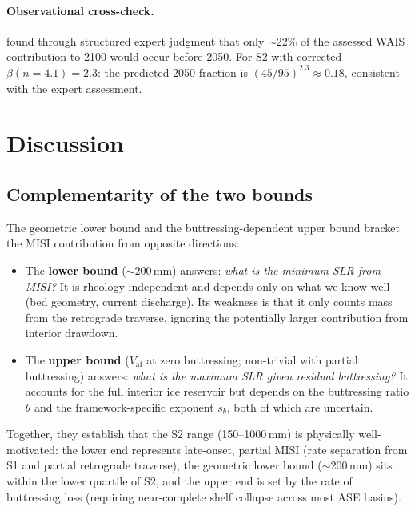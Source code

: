 \documentclass[11pt]{article}
\newcommand{\Vaf}{V_{\mathrm{af}}}
\begin{document}
\paragraph{Observational cross-check.} \citet{Bamber2019} found through structured expert judgment that only $\sim$22\% of the assessed WAIS contribution to 2100 would occur before 2050. For S2 with corrected $\beta(n{=}4.1) = 2.3$: the predicted 2050 fraction is $(45/95)^{2.3} \approx 0.18$, consistent with the expert assessment.


\section{Discussion}
\label{sec:discussion}

\subsection{Complementarity of the two bounds}

The geometric lower bound and the buttressing-dependent upper bound bracket the MISI contribution from opposite directions:

\begin{itemize}
	\item The \textbf{lower bound} ($\sim$200\,mm) answers: \emph{what is the minimum SLR from MISI?} It is rheology-independent and depends only on what we know well (bed geometry, current discharge). Its weakness is that it only counts mass from the retrograde traverse, ignoring the potentially larger contribution from interior drawdown.

	\item The \textbf{upper bound} ($\Vaf$ at zero buttressing; non-trivial with partial buttressing) answers: \emph{what is the maximum SLR given residual buttressing?} It accounts for the full interior ice reservoir but depends on the buttressing ratio $\theta$ and the framework-specific exponent $s_b$, both of which are uncertain.
\end{itemize}

Together, they establish that the S2 range (150--1000\,mm) is physically well-motivated: the lower end represents late-onset, partial MISI (rate separation from S1 and partial retrograde traverse), the geometric lower bound ($\sim$200\,mm) sits within the lower quartile of S2, and the upper end is set by the rate of buttressing loss (requiring near-complete shelf collapse across most ASE basins).
\end{document}
